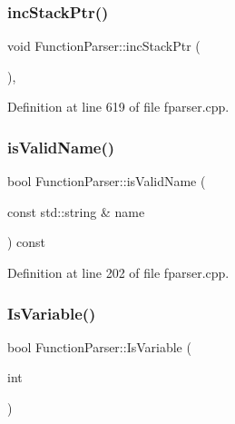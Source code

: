 \subsubsection{\texorpdfstring{inc\+Stack\+Ptr()}{incStackPtr()}}
{\footnotesize\ttfamily void Function\+Parser\+::inc\+Stack\+Ptr (\begin{DoxyParamCaption}{ }\end{DoxyParamCaption})\hspace{0.3cm}{\ttfamily [inline]}, {\ttfamily [private]}}



Definition at line 619 of file fparser.\+cpp.

\mbox{\label{class_function_parser_a79441f19176e18e88155f1101108dbe6}} 
\subsubsection{\texorpdfstring{is\+Valid\+Name()}{isValidName()}}
{\footnotesize\ttfamily bool Function\+Parser\+::is\+Valid\+Name (\begin{DoxyParamCaption}\item[{const std\+::string \&}]{name }\end{DoxyParamCaption}) const\hspace{0.3cm}{\ttfamily [private]}}



Definition at line 202 of file fparser.\+cpp.

\mbox{\label{class_function_parser_afd635d05f1b4d3ef6f09b75dd92926e5}} 
\subsubsection{\texorpdfstring{Is\+Variable()}{IsVariable()}}
{\footnotesize\ttfamily bool Function\+Parser\+::\+Is\+Variable (\begin{DoxyParamCaption}\item[{int}]{ }\end{DoxyParamCaption})\hspace{0.3cm}{\ttfamily [private]}}

